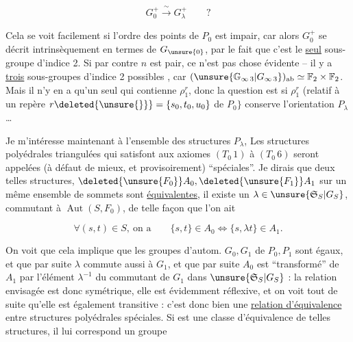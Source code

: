 \[
G_0^+\xrightarrow{\ \sim\ }G_\lambda^+\qquad ?
\tag*{$(44)$}
\]

Cela se voit facilement si l'ordre des points de $P_0$ est impair, car alors $G_0^+$ se décrit intrinsèquement  en termes de $G_{\unsure{0}}$, par le fait que c'est le \uline{seul} sous-groupe d'indice 2. Si par contre $n$ est pair, ce n'est pas chose évidente -- il y a \uline{trois} sous-groupes d'indice 2 possibles , car $(\unsure{\mathbb G_{\infty\,3}|G_{\infty\,3}})_{\mathrm{ab}}\simeq\mathbb F_2\times\mathbb F_2$. Mais il n'y en a qu'un seul qui contienne $\rho_1^r$, donc la question est si $\rho_1^r$ (relatif à un repère $r\deleted{\unsure{\}}}=\{s_0,t_0,u_0\}$ de $P_0\}$ conserve l'orientation  $P_\lambda$\ldots


Je m'intéresse maintenant à l'ensemble des structures $P_\lambda$,   Les structures polyédrales triangulées qui satisfont aux axiomes $(T_0\,1)$ à $(T_0\,6)$ seront appelées (à défaut de mieux, et provisoirement) ``spéciales''. Je dirais que deux telles structures,  $\deleted{\unsure{F_0}}A_0,\deleted{\unsure{F_1}}A_1$ sur un même ensemble de sommets  sont \uline{équivalentes}, il existe un $\lambda\in\unsure{\mathfrak S_S|G_S}$, commutant à $\operatorname{Aut}(S,F_0)$, de telle façon que l'on ait

\[
\forall(s,t)\in S,\ \text{on a}\qquad
 \{s,t\}\in A_0\Longleftrightarrow\{s,\lambda t\}\in A_1.
\tag*{$(45)$}
\]

On voit que cela implique que  les groupes d'autom. $G_0,G_1$ de $P_0,P_1$ sont égaux, et que par suite $\lambda$  commute aussi à $G_{1}$, et que  par suite $A_0$ est ``transformé'' de $A_1$ par l'élément $\lambda^{-1}$ du commutant de $G_1$ dans $\unsure{\mathfrak S_S|G_S}$ : la relation envisagée est donc symétrique, elle est évidemment réflexive, et on voit tout de suite qu'elle est également transitive :  c'est donc bien une \uline{relation d'équivalence} entre structures polyédrales spéciales. Si  \inserted{$\Pi$} est une classe d'équivalence de telles structures, il lui correspond un groupe

